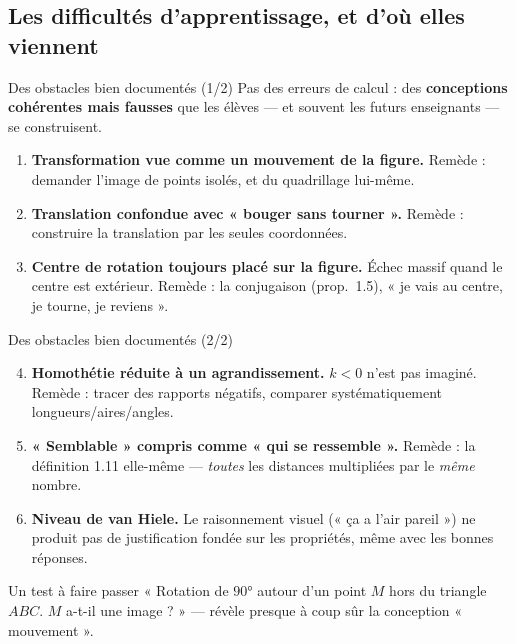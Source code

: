 \subsection{Les difficultés d'apprentissage, et d'où elles viennent}
\begin{frame}{Des obstacles bien documentés (1/2)}
  \small Pas des erreurs de calcul : des \textbf{conceptions
  cohérentes mais fausses} que les élèves --- et souvent les futurs
  enseignants --- se construisent.
  \begin{enumerate}
    \item \textbf{Transformation vue comme un mouvement de la figure.}
      Remède : demander l'image de points isolés, et du quadrillage
      lui-même.
    \item \textbf{Translation confondue avec « bouger sans tourner ».}
      Remède : construire la translation par les seules coordonnées.
    \item \textbf{Centre de rotation toujours placé sur la figure.}
      Échec massif quand le centre est extérieur. Remède : la
      conjugaison (prop.~1.5), « je vais au centre, je tourne, je
      reviens ».
  \end{enumerate}
\end{frame}

\begin{frame}{Des obstacles bien documentés (2/2)}
  \begin{enumerate}
    \setcounter{enumi}{3}
    \item \textbf{Homothétie réduite à un agrandissement.} $k<0$
      n'est pas imaginé. Remède : tracer des rapports négatifs,
      comparer systématiquement longueurs/aires/angles.
    \item \textbf{« Semblable » compris comme « qui se ressemble ».}
      Remède : la définition 1.11 elle-même --- \emph{toutes} les
      distances multipliées par le \emph{même} nombre.
    \item \textbf{Niveau de van Hiele.} Le raisonnement visuel
      (« ça a l'air pareil ») ne produit pas de justification fondée
      sur les propriétés, même avec les bonnes réponses.
  \end{enumerate}
  \begin{Classe}{Un test à faire passer}
    \footnotesize « Rotation de $90°$ autour d'un point $M$ hors du
    triangle $ABC$. $M$ a-t-il une image ? » --- révèle presque à coup
    sûr la conception « mouvement ».
  \end{Classe}
\end{frame}

